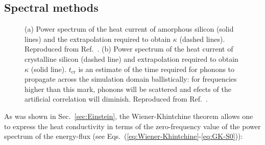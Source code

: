 \begin{LEtext}
\subsection{Spectral methods}  \label{sec:spectral-methods}
\begin{figure}[!tb]
    \begin{center}
        \hfill
    \end{center}
	\caption{
	(a) Power spectrum of the heat current of amorphous silicon (solid lines) and the extrapolation required to obtain $\kappa$ (dashed lines). Reproduced from Ref.~\cite{Lee1991}. 
	(b) Power spectrum of the heat current of crystalline silicon (dashed line) and extrapolation required to obtain $\kappa$ (solid line). $t_\mathrm{cr}$ is an estimate of the time required for phonons to propagate across the simulation domain ballistically: for frequencies higher than this mark, phonons will be scattered and efects of the artificial correlation will diminish. Reproduced from Ref.~\cite{Volz2000}. 
	} \label{fig:psd-expfit-examples}
\end{figure}
As was shown in Sec.~\ref{sec:Einstein}, the Wiener-Khintchine theorem allows one to express the heat conductivity in terms of the zero-frequency value of the power spectrum of the energy-flux (see Eqs.~(\ref{eq:Wiener-Khintchine}-\ref{eq:GK-S0})):
\begin{equation}

\end{equation}
\end{LEtext}
